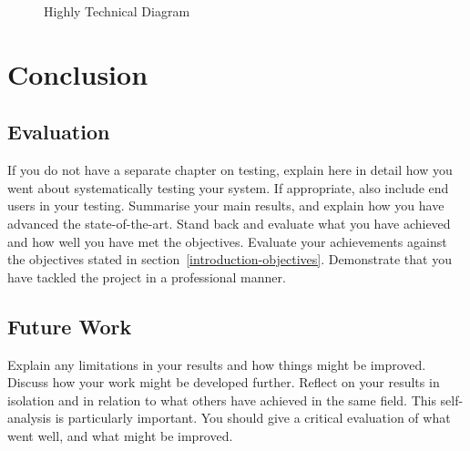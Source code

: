 \documentclass[a4paper,11pt]{report}
\begin{document}
\begin{figure}


  \caption{Highly Technical Diagram}

  \label{figure}

\end{figure}



\chapter{Conclusion}

\label{conclusion}

\section{Evaluation}

\label{conclusion-evaluation}

If you do not have a separate chapter on testing, explain here in detail how you
went about systematically testing your system. If appropriate, also include
end users in your testing. Summarise your main results, and explain how you have
advanced the state-of-the-art. Stand back and evaluate what you have achieved
and how well you have met the objectives. Evaluate your achievements against the
objectives stated in section~\ref{introduction-objectives}. Demonstrate that you
have tackled the project in a professional manner.

\section{Future Work}

\label{conclusion-future}

Explain any limitations in your results and how things might be improved.
Discuss how your work might be developed further. Reflect on your results in
isolation and in relation to what others have achieved in the same field. This
self-analysis is particularly important. You should give a critical evaluation
of what went well, and what might be improved.







\appendix
\end{document}
